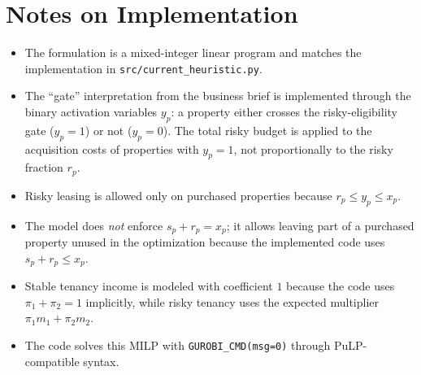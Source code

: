 \section*{Notes on Implementation}

\begin{itemize}
    \item The formulation is a mixed-integer linear program and matches the implementation in \texttt{src/current\_heuristic.py}.
    \item The ``gate'' interpretation from the business brief is implemented through the binary activation variables $y_p$: a property either crosses the risky-eligibility gate ($y_p=1$) or not ($y_p=0$). The total risky budget is applied to the acquisition costs of properties with $y_p=1$, not proportionally to the risky fraction $r_p$.
    \item Risky leasing is allowed only on purchased properties because $r_p \le y_p \le x_p$.
    \item The model does \emph{not} enforce $s_p + r_p = x_p$; it allows leaving part of a purchased property unused in the optimization because the implemented code uses $s_p + r_p \le x_p$.
    \item Stable tenancy income is modeled with coefficient $1$ because the code uses $\pi_1+\pi_2=1$ implicitly, while risky tenancy uses the expected multiplier $\pi_1 m_1 + \pi_2 m_2$.
    \item The code solves this MILP with \texttt{GUROBI\_CMD(msg=0)} through PuLP-compatible syntax.
\end{itemize}
